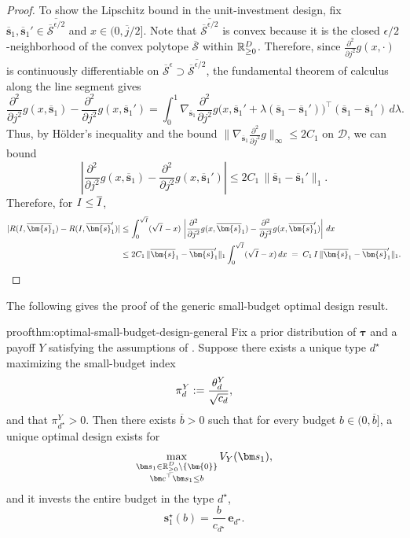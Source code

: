 \begin{proof}
  To show the Lipschitz bound in the unit-investment design, fix $\overline{\bm{s}}_1,\overline{\bm{s}}_1'\in\overline{\overline{\mathcal{S}}^{\epsilon/2}}$ and $x\in(0,\overline{j} / 2]$.
  Note that $\overline{\overline{\mathcal{S}}^{\epsilon/2}}$ is convex because it is the closed $\epsilon/2$-neighborhood of the convex polytope $\overline{\mathcal{S}}$ within $\mathbb{R}_{\ge 0}^D$.
  Therefore, since $\frac{\partial^2}{\partial j^2} g(x,\cdot)$ is continuously differentiable on $\overline{\mathcal{S}}^{\epsilon}\supset \overline{\overline{\mathcal{S}}^{\epsilon/2}}$, the fundamental theorem of calculus along the line segment gives
  \[
    \frac{\partial^2}{\partial j^2}
    g(x,\overline{\bm{s}}_1)-\frac{\partial^2}{\partial j^2}
    g(x,\overline{\bm{s}}_1')
    =
    \int_0^1
    \nabla_{\overline{\bm{s}}_1}\frac{\partial^2}{\partial j^2}
    g\big(x,\overline{\bm{s}}_1'+\lambda(\overline{\bm{s}}_1-\overline{\bm{s}}_1')\big)^{\!\top}
    (\overline{\bm{s}}_1-\overline{\bm{s}}_1')\,d\lambda.
  \]
  Thus, by Hölder's inequality and the bound $\|\nabla_{\overline{\bm{s}}_1}\frac{\partial^2}{\partial j^2} g\|_\infty\le 2 C_1$ on $\mathcal D$, we can bound
  \[
    \left|\frac{\partial^2}{\partial j^2}
    g(x,\overline{\bm{s}}_1)-\frac{\partial^2}{\partial j^2}
    g(x,\overline{\bm{s}}_1')\right|
    \le
    2 C_1\,\|\overline{\bm{s}}_1-\overline{\bm{s}}_1'\|_1.
  \]
  Therefore, for $I \le \overline{I}$,
  \begin{align*}
    |R(\invst,\overline{\bm{s}}_1)-R(\invst,\overline{\bm{s}}_1')|
    &\le
    \int_0^{\sqrt{\invst}} (\sqrt{\invst}-x)\,
    \left|\frac{\partial^2}{\partial j^2}
    g(x,\overline{\bm{s}}_1)-\frac{\partial^2}{\partial j^2}
    g(x,\overline{\bm{s}}_1')\right|\,dx\\
    &\le
    2 C_1\,\|\overline{\bm{s}}_1-\overline{\bm{s}}_1'\|_1
    \int_0^{\sqrt{\invst}} (\sqrt{\invst}-x)\,dx
    \;=\;
    C_1\,\invst\,\|\overline{\bm{s}}_1-\overline{\bm{s}}_1'\|_1.
  \end{align*}
\end{proof}

The following gives the proof of the generic small-budget optimal design result.

\begin{linkedresult}{proof}{thm:optimal-small-budget-design-general}
  \label{thm:optimal-small-budget-design-general-appendix}
  Fix a prior distribution of $\bm\tau$ and a payoff $Y$ satisfying the assumptions of
  .
  Suppose there exists a unique type $d^\star$ maximizing the small-budget index
  \[
    \pi_d^Y
    :=
    \frac{\theta_d^Y}{\sqrt{c_{d}}},
  \]
  and that $\pi_{d^\star}^Y>0$.
  Then there exists $\overline{b}>0$ such that for every budget $b\in(0,\overline{b}]$, a unique optimal design exists for
  \[
    \max_{\substack{\bm s_1\in\R_{\geq 0}^{D} \setminus \{\bm{0}\}\\ \bm c^\top \bm s_1\le b}}
    V_Y(\bm s_1),
  \]
  and it invests the entire budget in the type $d^\star$,
  \[
    \bm{s}_1^\star(b) =
    \frac{b}{c_{d^\star}}\,\bm{e}_{d^\star}.
  \]
\end{linkedresult}

